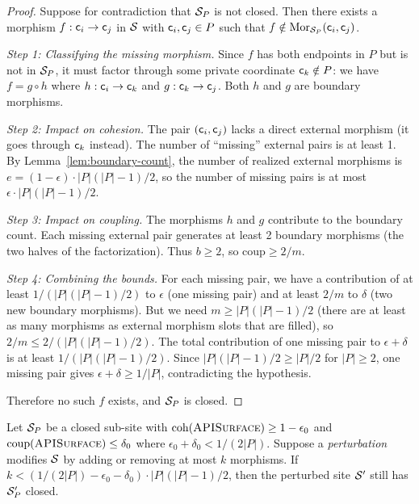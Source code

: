 \documentclass[11pt]{article}
\newcommand{\APISurface}{\textsc{APISurface}}
\newcommand{\CohIndex}{\mathrm{coh}}
\newcommand{\CoupIndex}{\mathrm{coup}}
\begin{document}
\begin{proof}
Suppose for contradiction that $\mathcal{S}_P$ is not closed.  Then there exists
a morphism $f : \mathsf{c}_i \to \mathsf{c}_j$ in $\mathcal{S}$ with $\mathsf{c}_i, \mathsf{c}_j
\in P$ such that $f \notin \mathrm{Mor}_{\mathcal{S}_P}(\mathsf{c}_i, \mathsf{c}_j)$.

\emph{Step 1: Classifying the missing morphism.}
Since $f$ has both endpoints in $P$ but is not in $\mathcal{S}_P$, it must factor
through some private coordinate $\mathsf{c}_k \notin P$: we have
$f = g \circ h$ where $h : \mathsf{c}_i \to \mathsf{c}_k$ and
$g : \mathsf{c}_k \to \mathsf{c}_j$.  Both $h$ and $g$ are boundary morphisms.

\emph{Step 2: Impact on cohesion.}
The pair $(\mathsf{c}_i, \mathsf{c}_j)$ lacks a direct external morphism (it goes
through $\mathsf{c}_k$ instead).  The number of ``missing'' external pairs is
at least 1.  By Lemma~\ref{lem:boundary-count}, the number of realized
external morphisms is $e = (1 - \epsilon) \cdot |P|(|P|-1)/2$, so the
number of missing pairs is at most $\epsilon \cdot |P|(|P|-1)/2$.

\emph{Step 3: Impact on coupling.}
The morphisms $h$ and $g$ contribute to the boundary count.  Each missing
external pair generates at least 2 boundary morphisms (the two halves of
the factorization).  Thus $b \geq 2$, so
$\CoupIndex \geq 2/m$.

\emph{Step 4: Combining the bounds.}
For each missing pair, we have a contribution of at least $1/(|P|(|P|-1)/2)$
to $\epsilon$ (one missing pair) and at least $2/m$ to $\delta$ (two new
boundary morphisms).  But we need $m \geq |P|(|P|-1)/2$ (there are at
least as many morphisms as external morphism slots that are filled), so
$2/m \leq 2/(|P|(|P|-1)/2)$.  The total contribution of one missing pair
to $\epsilon + \delta$ is at least $1/(|P|(|P|-1)/2)$.  Since
$|P|(|P|-1)/2 \geq |P|/2$ for $|P| \geq 2$, one missing pair gives
$\epsilon + \delta \geq 1/|P|$, contradicting the hypothesis.

Therefore no such $f$ exists, and $\mathcal{S}_P$ is closed.
\end{proof}

\begin{theorem}\label{thm:stability}
Let $\mathcal{S}_P$ be a closed sub-site with $\CohIndex(\APISurface) \geq 1 -
\epsilon_0$ and $\CoupIndex(\APISurface) \leq \delta_0$ where
$\epsilon_0 + \delta_0 < 1/(2|P|)$.  Suppose a \emph{perturbation}
modifies $\mathcal{S}$ by adding or removing at most $k$ morphisms.  If
$k < (1/(2|P|) - \epsilon_0 - \delta_0) \cdot |P|(|P|-1)/2$,
then the perturbed site $\mathcal{S}'$ still has $\mathcal{S}'_P$ closed.
\end{theorem}
\end{document}
